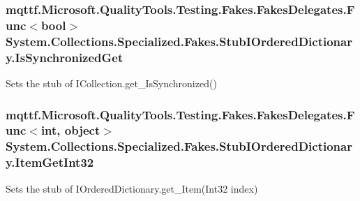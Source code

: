 \hypertarget{class_system_1_1_collections_1_1_specialized_1_1_fakes_1_1_stub_i_ordered_dictionary_adb19e739ede2449391cd1354a1645716}{
\subsubsection[{Is\-Synchronized\-Get}]{\setlength{\rightskip}{0pt plus 5cm}mqttf.\-Microsoft.\-Quality\-Tools.\-Testing.\-Fakes.\-Fakes\-Delegates.\-Func$<$bool$>$ System.\-Collections.\-Specialized.\-Fakes.\-Stub\-I\-Ordered\-Dictionary.\-Is\-Synchronized\-Get}}\label{class_system_1_1_collections_1_1_specialized_1_1_fakes_1_1_stub_i_ordered_dictionary_adb19e739ede2449391cd1354a1645716}


Sets the stub of I\-Collection.\-get\-\_\-\-Is\-Synchronized()

\hypertarget{class_system_1_1_collections_1_1_specialized_1_1_fakes_1_1_stub_i_ordered_dictionary_a24616bd6430dcfdc72dc4be60439b1f7}{
\subsubsection[{Item\-Get\-Int32}]{\setlength{\rightskip}{0pt plus 5cm}mqttf.\-Microsoft.\-Quality\-Tools.\-Testing.\-Fakes.\-Fakes\-Delegates.\-Func$<$int, object$>$ System.\-Collections.\-Specialized.\-Fakes.\-Stub\-I\-Ordered\-Dictionary.\-Item\-Get\-Int32}}\label{class_system_1_1_collections_1_1_specialized_1_1_fakes_1_1_stub_i_ordered_dictionary_a24616bd6430dcfdc72dc4be60439b1f7}


Sets the stub of I\-Ordered\-Dictionary.\-get\-\_\-\-Item(\-Int32 index)

